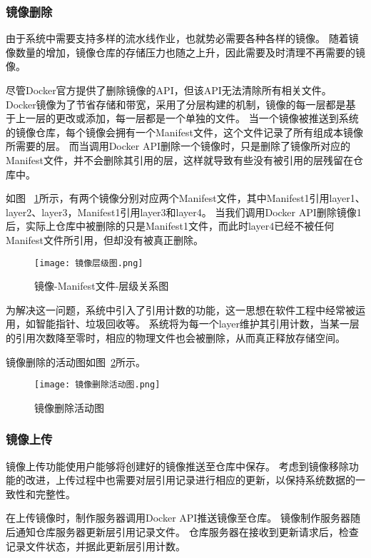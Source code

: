 \subsubsection{镜像删除}

由于系统中需要支持多样的流水线作业，也就势必需要各种各样的镜像。
随着镜像数量的增加，镜像仓库的存储压力也随之上升，因此需要及时清理不再需要的镜像。

尽管Docker官方提供了删除镜像的API，但该API无法清除所有相关文件。
Docker镜像为了节省存储和带宽，采用了分层构建的机制，镜像的每一层都是基于上一层的更改或添加，每一层都是一个单独的文件。
当一个镜像被推送到系统的镜像仓库，每个镜像会拥有一个Manifest文件，这个文件记录了所有组成本镜像所需要的层。
而当调用Docker API删除一个镜像时，只是删除了镜像所对应的Manifest文件，并不会删除其引用的层，这样就导致有些没有被引用的层残留在仓库中。

如图~ \ref{fig:镜像-Manifest文件-层级关系图}所示，有两个镜像分别对应两个Manifest文件，其中Manifest1引用layer1、layer2、layer3，Manifest1引用layer3和layer4。
当我们调用Docker API删除镜像1后，实际上仓库中被删除的只是Manifest1文件，而此时layer4已经不被任何Manifest文件所引用，但却没有被真正删除。

\begin{figure}[h]
  \centering
  \texttt{[image: 镜像层级图.png]}
  \caption{镜像-Manifest文件-层级关系图}
  \label{fig:镜像-Manifest文件-层级关系图}
\end{figure}

为解决这一问题，系统中引入了引用计数的功能，这一思想在软件工程中经常被运用，如智能指针、垃圾回收等。
系统将为每一个layer维护其引用计数，当某一层的引用次数降至零时，相应的物理文件也会被删除，从而真正释放存储空间。

镜像删除的活动图如图~\ref{fig:镜像删除活动图}所示。

\begin{figure}[h]
  \centering
  \texttt{[image: 镜像删除活动图.png]}
  \caption{镜像删除活动图}
  \label{fig:镜像删除活动图}
\end{figure}

\subsubsection{镜像上传}
镜像上传功能使用户能够将创建好的镜像推送至仓库中保存。
考虑到镜像移除功能的改进，上传过程中也需要对层引用记录进行相应的更新，以保持系统数据的一致性和完整性。

在上传镜像时，制作服务器调用Docker API推送镜像至仓库。
镜像制作服务器随后通知仓库服务器更新层引用记录文件。
仓库服务器在接收到更新请求后，检查记录文件状态，并据此更新层引用计数。

